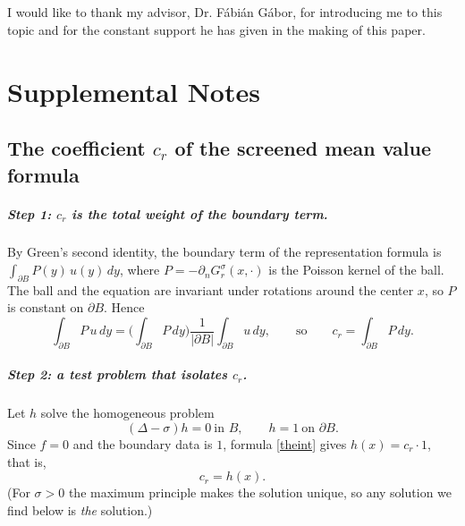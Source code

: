 \documentclass[
]{elteiktdk}[2024/04/26]
\begin{document}
	
	\chapter*{\acklabel}
	I would like to thank my advisor, Dr. Fábián Gábor, for introducing me to this topic and for the constant support he has given in the making of this paper. 
	
	\appendix
	
	\chapter{Supplemental Notes}
	\label{app:supplemental}	
	
	\section{The coefficient $c_r$ of the screened mean value formula}
	\label{app:cr}
	
	\paragraph{Step 1: $c_r$ is the total weight of the boundary term.}
	By Green's second identity, the boundary term of the representation formula is
	$\int_{\partial B} P(y)\,u(y)\,dy$, where $P=-\partial_n G^{\sigma}_r(x,\cdot)$
	is the Poisson kernel of the ball. The ball and the equation are invariant
	under rotations around the center $x$, so $P$ is constant on $\partial B$.
	Hence
	\begin{equation}
		\int_{\partial B} P\,u\,dy = \Big(\int_{\partial B}P\,dy\Big)\frac{1}{|\partial B|}\int_{\partial B}u\,dy,
		\qquad\text{so}\qquad c_r=\int_{\partial B}P\,dy .
	\end{equation}
	
	\paragraph{Step 2: a test problem that isolates $c_r$.}
	Let $h$ solve the homogeneous problem
	\begin{equation}
		(\Delta-\sigma)h=0 \ \text{in } B,\qquad h=1 \ \text{on } \partial B .
	\end{equation}
	Since $f=0$ and the boundary data is $1$, formula \eqref{theint} gives
	$h(x)=c_r\cdot 1$, that is,
	\begin{equation}
		c_r = h(x).
	\end{equation}
	(For $\sigma>0$ the maximum principle makes the solution unique, so any solution we
	find below is \emph{the} solution.)
	
\end{document}
